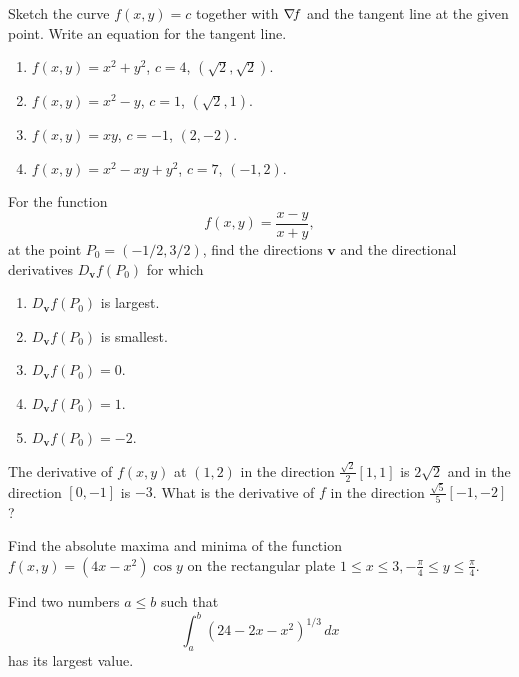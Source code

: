 \begin{problem}[Basic]
Sketch the curve $f(x,y)=c$ together with $\mathop{\nabla\! {f}}$ and the tangent line at the given point.  Write an equation for the tangent line.
\begin{enumerate}
	\item $f(x,y)=x^2+y^2$, $c=4$, $(\sqrt{2}, \sqrt{2})$.
	\item $f(x,y)=x^2-y$, $c=1$, $(\sqrt{2}, 1)$.
	\item $f(x,y)=xy$, $c=-1$, $(2, -2)$.
	\item $f(x,y)=x^2-xy+y^2$, $c=7$, $(-1,2)$.
\end{enumerate}
\end{problem}

\begin{problem}[Basic]
For the function
\begin{equation*}
f(x,y) = \frac{x-y}{x+y},
\end{equation*}
at the point $P_0 = (-1/2, 3/2)$, find the directions $\boldsymbol{v}$ and the directional derivatives $D_{\boldsymbol{v}}f(P_0)$ for which
\begin{enumerate}
	\item $D_{\boldsymbol{v}}f(P_0)$ is largest.
	\item $D_{\boldsymbol{v}}f(P_0)$ is smallest.
	\item $D_{\boldsymbol{v}}f(P_0) = 0$.
	\item $D_{\boldsymbol{v}}f(P_0) = 1$.
	\item $D_{\boldsymbol{v}}f(P_0) = -2$.
\end{enumerate}
\end{problem}

\begin{problem}[Intermediate]
The derivative of $f(x,y)$ at $(1,2)$ in the direction $\frac{\sqrt{2}}{2}[1,1]$ is $2\sqrt{2}$ and in the direction $[0,-1]$ is $-3$.  What is the derivative of $f$ in the direction $\frac{\sqrt{5}}{5}[-1,-2]$?
\end{problem}

\begin{problem}[Intermediate]
Find the absolute maxima and minima of the function $f(x,y) = (4x-x^2)\cos y$ on the rectangular plate $1\leq x \leq 3, -\frac{\pi}{4} \leq y \leq \frac{\pi}{4}$.
\end{problem}

\begin{problem}[Basic]
Find two numbers $a \leq b$ such that 
\begin{equation*}
\int_a^b (24-2x-x^2)^{1/3}\, dx
\end{equation*}
has its largest value.
\end{problem}

